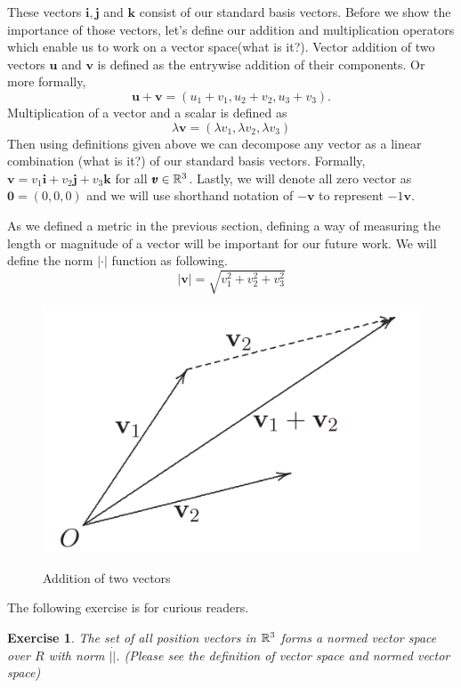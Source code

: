 \documentclass[12pt]{article}
\newtheorem{exercise}{Exercise}[section]
\begin{document}
These vectors $\pmb{i}, \pmb{j}$ and $\pmb{k}$ consist of our standard basis vectors. 
Before we show the importance of those vectors, let's define our addition and multiplication
operators which enable us to work on a vector space(what is it?). Vector addition of two 
vectors $\pmb{u}$ and $\pmb{v}$ is defined as the entrywise addition of their components. Or more formally,
$$\pmb{u}+\pmb{v} = (u_1+v_1, u_2+v_2, u_3+v_3).$$
Multiplication of a vector and a scalar is defined as 
$$ \lambda \pmb{v} = (\lambda v_1, \lambda v_2, \lambda v_3) $$
Then using definitions given above we can decompose any vector as a linear combination (what is it?)
of our standard basis vectors. Formally, $\pmb{v} = v_1 \pmb{i} + v_2 \pmb{j} + v_3 \pmb{k}$ for all $\pmb{v} \in \mathbb{R}^3$.
Lastly, we will denote all zero vector as $\pmb{0} = (0,0,0)$ and we will use shorthand notation of
$-\pmb{v}$ to represent $-1\pmb{v}$.

As we defined a metric in the previous section, defining a way of measuring the length
or magnitude of a vector will be important for our future work. We will define the norm
$|\cdot|$ function as following.
$$ |\pmb{v}| = \sqrt{ v_1^2 + v_2^2 + v_3^2 } $$

\begin{center}
  \begin{figure}[h]
    \centering
    \includegraphics[width=\linewidth/3]{figures/fig4.png}
    \label{fig:4}
    \caption{Addition of two vectors}
  \end{figure}
\end{center}

The following exercise is for curious readers.

\begin{exercise}
  The set of all position vectors in $\mathbb{R}^3$ forms a normed vector space over $R$ with norm $| \dot |$. 
  (Please see the definition of vector space and normed vector space)
\end{exercise}
\end{document}
